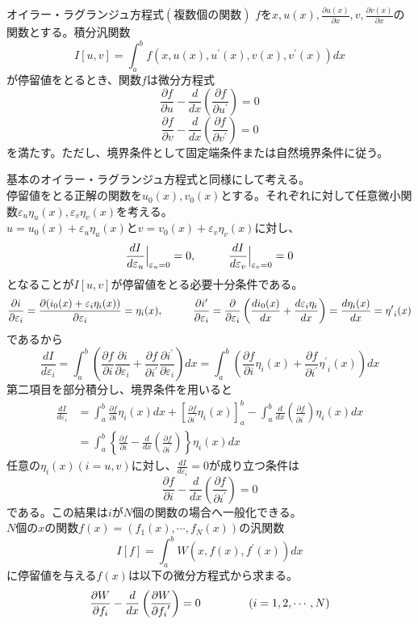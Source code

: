 \documentclass{jsarticle}
\begin{document}
\begin{itembox}[l]{オイラー・ラグランジュ方程式\((複数個の関数)\)}
\(f\)を\(x,u(x),\frac{\partial u(x)}{\partial x},v,\frac{\partial v(x)}{\partial x}\)の関数とする。積分汎関数
\[I[u,v]=\int_{a}^{b}f(x,u(x),u^{\prime}(x),v(x),v^{\prime}(x))dx\]
が停留値をとるとき、関数\(f\)は微分方程式
\[\frac{\partial f}{\partial u}-\frac{d}{dx}\left(\frac{\partial f}{\partial u^{\prime}}\right)=0\]
\[\frac{\partial f}{\partial v}-\frac{d}{dx}\left(\frac{\partial f}{\partial v^{\prime}}\right)=0\]
を満たす。ただし、境界条件として固定端条件または自然境界条件に従う。
\end{itembox}
基本のオイラー・ラグランジュ方程式と同様にして考える。\\
停留値をとる正解の関数を\(u_{0}(x),v_{0}(x)\)とする。それぞれに対して任意微小関数\(\varepsilon_{u}\eta_{u}(x),\varepsilon_{v}\eta_{v}(x)\)を考える。\\
\(u=u_{0}(x)+\varepsilon_{u}\eta_{u}(x)\)と\(v=v_{0}(x)+\varepsilon_{v}\eta_{v}(x)\)に対し、
\[\frac{dI}{d\varepsilon_{u}}\Big|_{\varepsilon_{u}=0}=0,\hspace{10mm}\frac{dI}{d\varepsilon_{v}}\Big|_{\varepsilon_{v}=0}=0\]
となることが\(I[u,v]\)が停留値をとる必要十分条件である。
\[\frac{\partial i}{\partial\varepsilon_{i}}=\frac{\partial(i_{0}(x)+\varepsilon_{i}\eta_{i}(x))}{\partial\varepsilon_{i}}=\eta_{i}(x),\hspace{10mm}\frac{\partial i^{\prime}}{\partial\varepsilon_{i}}=\frac{\partial}{\partial\varepsilon_{i}}\left(\frac{d i_{0}(x)}{dx}+\frac{d\varepsilon_{i}\eta_{i}}{dx}\right)=\frac{d\eta_{i}(x)}{dx}={\eta^{\prime}}_{i}(x)\]
であるから
\[\frac{dI}{d\varepsilon_{i}}=\int_{a}^{b}\left(\frac{\partial f}{\partial i}\frac{\partial i}{\partial\varepsilon_{i}}+\frac{\partial f}{\partial i^{\prime}}\frac{\partial i^{\prime}}{\partial\varepsilon_{i}}\right)dx=\int_{a}^{b}\left(\frac{\partial f}{\partial i}\eta_{i}(x)+\frac{\partial f}{\partial i^{\prime}}{\eta^{\prime}}_{i}(x)\right)dx\]
第二項目を部分積分し、境界条件を用いると
\begin{align*}
\frac{dI}{d\varepsilon_{i}}&=\int_{a}^{b}\frac{\partial f}{\partial i}\eta_{i}(x)dx+\left[\frac{\partial f}{\partial i^{\prime}}\eta_{i}(x)\right]_{a}^{b}-\int_{a}^{b}\frac{d}{dx}\left(\frac{\partial f}{\partial i^{\prime}}\right)\eta_{i}(x)dx\\
&=\int_{a}^{b}\left\{\frac{\partial f}{\partial i}-\frac{d}{dx}\left(\frac{\partial f}{\partial i^{\prime}}\right)\right\}\eta_{i}(x)dx
\end{align*}
任意の\(\eta_{i}(x)\)\((i=u,v)\)に対し、\(\frac{dI}{d\varepsilon_{i}}=0\)が成り立つ条件は
\[\frac{\partial f}{\partial i}-\frac{d}{dx}\left(\frac{\partial f}{\partial i^{\prime}}\right)=0\]
である。この結果は\(i\)が\(N\)個の関数の場合へ一般化できる。\\
\(N\)個の\(x\)の関数\(f(x)=(f_{1}(x),\cdots,f_{N}(x))\)の汎関数
\[I[f]=\int_{a}^{b}W(x,f(x),f^{\prime}(x))dx\]
に停留値を与える\(f(x)\)は以下の微分方程式から求まる。
\[\frac{\partial W}{\partial f_{i}}-\frac{d}{dx}\left(\frac{\partial W}{\partial {f_{i}}^{\prime}}\right)=0\hspace{15mm}(i=1,2,\cdots,N)\]
\end{document}

